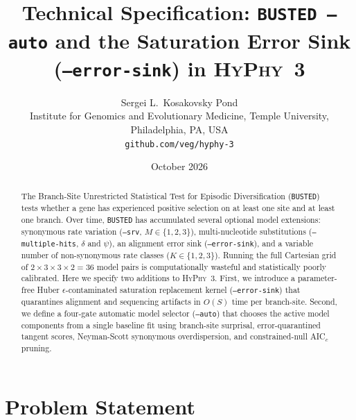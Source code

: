 \documentclass[11pt]{article}
\title{\textbf{Technical Specification: \texttt{BUSTED --auto} and the Saturation Error Sink (\texttt{--error-sink}) in \textsc{HyPhy}~3}}
\author{Sergei L.\ Kosakovsky Pond\\
\small Institute for Genomics and Evolutionary Medicine, Temple University, Philadelphia, PA, USA\\
\small \texttt{github.com/veg/hyphy-3}}
\date{October 2026}
\begin{document}
\maketitle

\begin{abstract}
\noindent The Branch-Site Unrestricted Statistical Test for Episodic Diversification (\texttt{BUSTED}) tests whether a gene has experienced positive selection on at least one site and at least one branch. Over time, \texttt{BUSTED} has accumulated several optional model extensions: synonymous rate variation (\texttt{--srv}, $M \in \{1, 2, 3\}$), multi-nucleotide substitutions (\texttt{--multiple-hits}, $\delta$ and $\psi$), an alignment error sink (\texttt{--error-sink}), and a variable number of non-synonymous rate classes ($K \in \{1, 2, 3\}$). Running the full Cartesian grid of $2 \times 3 \times 3 \times 2 = 36$ model pairs is computationally wasteful and statistically poorly calibrated. Here we specify two additions to \textsc{HyPhy}~3. First, we introduce a parameter-free Huber $\epsilon$-contaminated saturation replacement kernel (\texttt{--error-sink}) that quarantines alignment and sequencing artifacts in $O(S)$ time per branch-site. Second, we define a four-gate automatic model selector (\texttt{--auto}) that chooses the active model components from a single baseline fit using branch-site surprisal, error-quarantined tangent scores, Neyman-Scott synonymous overdispersion, and constrained-null AIC$_c$ pruning.
\end{abstract}

\section{Problem Statement}
\end{document}
